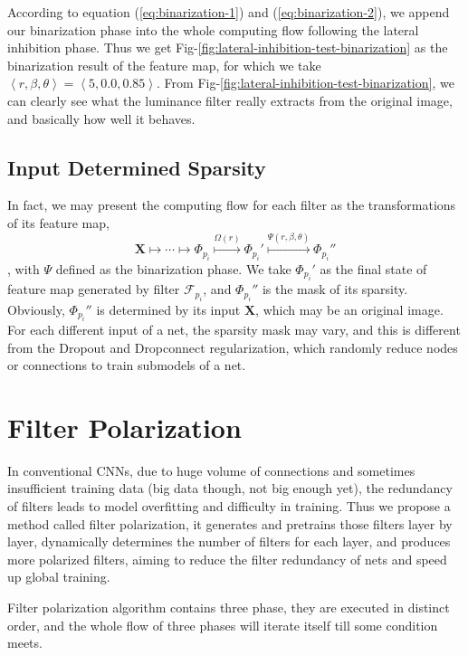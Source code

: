 \documentclass[conference]{IEEEtran}
\begin{document}
According to equation (\ref{eq:binarization-1}) and (\ref{eq:binarization-2}), we append our binarization phase
into the whole computing flow following the lateral inhibition phase. Thus we get Fig-\ref{fig:lateral-inhibition-test-binarization}
as the binarization result of the feature map, for which we take $\left<r,\beta,\theta\right>=\left<5,0.0,0.85\right>$.
From Fig-\ref{fig:lateral-inhibition-test-binarization}, we can clearly see what the luminance filter really extracts
from the original image, and basically how well it behaves.

\subsection{Input Determined Sparsity}
In fact, we may present the computing flow for each filter as the transformations of its feature map,
$$\mathbf{X}\longmapsto\cdots\longmapsto\Phi_{p_i}\overset{\Omega(r)}{\longmapsto}\Phi_{p_i}'\overset{\Psi(r,\beta,\theta)}{\longmapsto}\Phi_{p_i}''$$,
with $\Psi$ defined as the binarization phase. We take $\Phi_{p_i}'$ as the final state of feature map generated by
filter $\mathcal{F}_{p_i}$, and $\Phi_{p_i}''$ is the mask of its sparsity.
Obviously, $\Phi_{p_i}''$ is determined by its input $\mathbf{X}$, which may be an original image.
For each different input of a net, the sparsity mask may vary, and this is different from the Dropout\cite{hinton2012improving}
and Dropconnect\cite{wan2013regularization} regularization, which randomly reduce nodes or connections to train submodels of a net.


\section{Filter Polarization}
In conventional CNNs, due to huge volume of connections and sometimes insufficient training
data (big data though, not big enough yet), the redundancy of filters leads to model
overfitting and difficulty in training\cite{jaderberg2014speeding,chen2015compressing}.
Thus we propose a method called filter polarization,
it generates and pretrains those filters layer by layer, dynamically
determines the number of filters for each layer, and produces more polarized filters,
aiming to reduce the filter redundancy of nets and speed up global training.

Filter polarization algorithm contains three phase, they are executed in distinct order,
and the whole flow of three phases will iterate itself till some condition meets.
\end{document}
